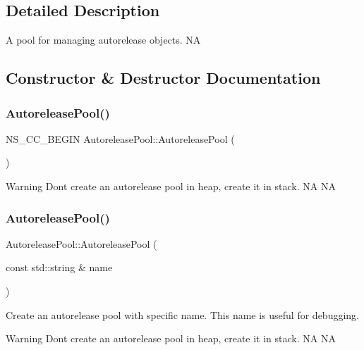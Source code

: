 \subsection{Detailed Description}
A pool for managing autorelease objects.  NA 

\subsection{Constructor \& Destructor Documentation}
\mbox{\label{classAutoreleasePool_a8eb236761eacf2caf327b597f4759175}} 
\subsubsection{\texorpdfstring{Autorelease\+Pool()}{AutoreleasePool()}\hspace{0.1cm}{\footnotesize\ttfamily [1/4]}}
{\footnotesize\ttfamily N\+S\+\_\+\+C\+C\+\_\+\+B\+E\+G\+IN Autorelease\+Pool\+::\+Autorelease\+Pool (\begin{DoxyParamCaption}{ }\end{DoxyParamCaption})}

\begin{DoxyWarning}{Warning}
Don\textquotesingle{}t create an autorelease pool in heap, create it in stack.  NA  NA 
\end{DoxyWarning}
\mbox{\label{classAutoreleasePool_ac294293fe0029e3d494f95f1a8bb02d8}} 
\subsubsection{\texorpdfstring{Autorelease\+Pool()}{AutoreleasePool()}\hspace{0.1cm}{\footnotesize\ttfamily [2/4]}}
{\footnotesize\ttfamily Autorelease\+Pool\+::\+Autorelease\+Pool (\begin{DoxyParamCaption}\item[{const std\+::string \&}]{name }\end{DoxyParamCaption})}

Create an autorelease pool with specific name. This name is useful for debugging. \begin{DoxyWarning}{Warning}
Don\textquotesingle{}t create an autorelease pool in heap, create it in stack.  NA  NA
\end{DoxyWarning}

